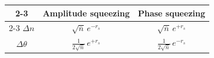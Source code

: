 \begin{table}[H]
\centering
\begin{tabular}{@{}ccc@{}}
\cmidrule(l){2-3}
                & Amplitude squeezing                            & Phase squeezing                                \\[0.4ex] \cmidrule(l){2-3} 
$\Delta n$      & $\sqrt{\overline{n}}\, e^{-r_s}$            & $\sqrt{\overline{n}}\, e^{+r_s}$            \\[0.75ex]
$\Delta \theta$ & $\frac{1}{2\sqrt{\overline{n}}}\, e^{+r_s}$ & $\frac{1}{2\sqrt{\overline{n}}}\, e^{-r_s}$ \\ \bottomrule
\end{tabular}
\end{table}